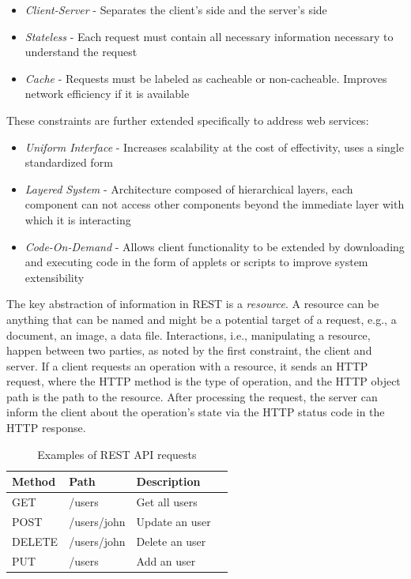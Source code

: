\begin{itemize}
    \item \textit{Client-Server} - Separates the client's side and the server's side
    \item \textit{Stateless} - Each request must contain all necessary information necessary to understand the request
    \item \textit{Cache} - Requests must be labeled as cacheable or non-cacheable. Improves network efficiency if it is available
\end{itemize}

These constraints are further extended specifically to address web services:
\begin{itemize}
    \item \textit{Uniform Interface} - Increases scalability at the cost of effectivity, uses a single standardized form
    \item \textit{Layered System} - Architecture composed of hierarchical layers, each component can not access other components beyond the immediate layer with which it is interacting
    \item \textit{Code-On-Demand} - Allows client functionality to be extended by downloading and executing code in the form of applets or scripts to improve system extensibility
\end{itemize}

The key abstraction of information in REST is a \textit{resource}. A resource can be anything that can be named and might be a potential target of a request, e.g., a document, an image, a data file. Interactions, i.e., manipulating a resource, happen between two parties, as noted by the first constraint, the client and server. If a client requests an operation with a resource, it sends an HTTP request, where the HTTP method is the type of operation, and the HTTP object path is the path to the resource. After processing the request, the server can inform the client about the operation's state via the HTTP status code in the HTTP response.\cite{RestAPI}

\begin{table}[hbt]
\centering
\caption{Examples of REST API requests}
\label{restapiex}
\begin{tabular}{|l|l|l|l|}
\hline
\textbf{Method} & \textbf{Path} & \textbf{Description} \\ \hline
 GET & /users & Get all users \\ \hline
 POST & /users/john & Update an user  \\ \hline
 DELETE & /users/john &  Delete an user \\ \hline
 PUT & /users & Add an user \\ \hline
\end{tabular}
\end{table} 

